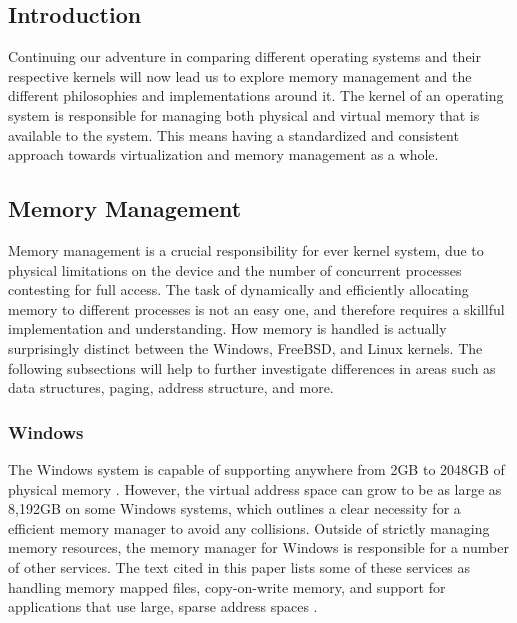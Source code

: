 
\subsection{Introduction}
\label{sec:Introduction}
\par Continuing our adventure in comparing different operating systems and their respective kernels will now lead us to explore memory management and the different philosophies and implementations around it.
The kernel of an operating system is responsible for managing both physical and virtual memory that is available to the system.
This means having a standardized and consistent approach towards virtualization and memory management as a whole.

\subsection{Memory Management}
\label{sec:Memory Management}
\par Memory management is a crucial responsibility for ever kernel system, due to physical limitations on the device and the number of concurrent processes contesting for full access.
The task of dynamically and efficiently allocating memory to different processes is not an easy one, and therefore requires a skillful implementation and understanding.
How memory is handled is actually surprisingly distinct between the Windows, FreeBSD, and Linux kernels.
The following subsections will help to further investigate differences in areas such as data structures, paging, address structure, and more.

\subsubsection{Windows}
\label{sub:Memory Management Windows}
\par The Windows system is capable of supporting anywhere from 2GB to 2048GB of physical memory \cite{win:2}.
However, the virtual address space can grow to be as large as 8,192GB on some Windows systems, which outlines a clear necessity for a efficient memory manager to avoid any collisions.
Outside of strictly managing memory resources, the memory manager for Windows is responsible for a number of other services.
The text cited in this paper lists some of these services as handling memory mapped files, copy-on-write memory, and support for applications that use large, sparse address spaces \cite{win:2}.

